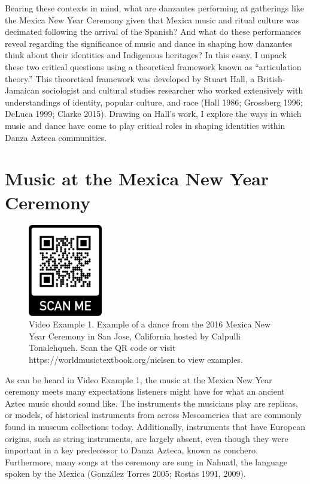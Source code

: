 \documentclass[twoside]{article}
\providecommand{\wmturl}{https://worldmusictextbook.org/nielsen}
\providecommand{\wmturlcaption}{
  Scan the QR code or visit \wmturl{} to view examples.
}
\begin{document}
Bearing these contexts in mind, what are danzantes performing at
gatherings like the Mexica New Year Ceremony given that Mexica music and
ritual culture was decimated following the arrival of the Spanish? And
what do these performances reveal regarding the significance of music
and dance in shaping how danzantes think about their identities and
Indigenous heritages? In this essay, I unpack these two critical
questions using a theoretical framework known as ``articulation
theory.'' This theoretical framework was developed by Stuart Hall, a
British-Jamaican sociologist and cultural studies researcher who worked
extensively with understandings of identity, popular culture, and race
(Hall 1986; Grossberg 1996; DeLuca 1999; Clarke 2015). Drawing on Hall's
work, I explore the ways in which music and dance have come to play
critical roles in shaping identities within Danza Azteca communities.

\hypertarget{music-at-the-mexica-new-year-ceremony}{%
\section*{Music at the Mexica New Year
Ceremony}\label{music-at-the-mexica-new-year-ceremony}}

\begin{figure}
  \centering
  \includegraphics[height=4cm]{qr-rick.png}
  \caption*{Video Example 1. Example of a dance from the 2016 Mexica New Year
  Ceremony in San Jose, California hosted by Calpulli Tonalehqueh. \wmturlcaption}
\end{figure}

As can be heard in Video Example 1, the music at the Mexica New Year
ceremony meets many expectations listeners might have for what an
ancient Aztec music should sound like. The instruments the musicians
play are replicas, or models, of historical instruments from across
Mesoamerica that are commonly found in museum collections today.
Additionally, instruments that have European origins, such as string
instruments, are largely absent, even though they were important in a
key predecessor to Danza Azteca, known as conchero. Furthermore, many
songs at the ceremony are sung in Nahuatl, the language spoken by the
Mexica (González Torres 2005; Rostas 1991, 2009).
\end{document}
